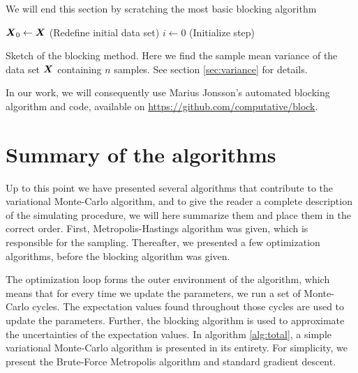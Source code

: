 We will end this section by scratching the most basic blocking algorithm

\IncMargin{1em}
\begin{algorithm}
	\SetAlgoLined
	\BlankLine
	$\boldsymbol{{X}}_0\leftarrow \boldsymbol{{X}}$ (Redefine initial data set)\;
	$i\leftarrow 0$ (Initialize step)\;
	\caption{Sketch of the blocking method. Here we find the sample mean variance of the data set $\boldsymbol{{X}}$ containing $n$ samples. See section \ref{sec:variance} for details.}
	\label{alg:blocking}
\end{algorithm}\DecMargin{1em}

In our work, we will consequently use Marius Jonsson's automated blocking algorithm and code, available on \url{https://github.com/computative/block}.

\section{Summary of the algorithms}
Up to this point we have presented several algorithms that contribute to the variational Monte-Carlo algorithm, and to give the reader a complete description of the simulating procedure, we will here summarize them and place them in the correct order. First, Metropolis-Hastings algorithm was given, which is responsible for the sampling. Thereafter, we presented a few optimization algorithms, before the blocking algorithm was given. 

The optimization loop forms the outer environment of the algorithm, which means that for every time we update the parameters, we run a set of Monte-Carlo cycles. The expectation values found throughout those cycles are used to update the parameters. Further, the blocking algorithm is used to approximate the uncertainties of the expectation values. In algorithm \ref{alg:total}, a simple variational Monte-Carlo algorithm is presented in its entirety. For simplicity, we present the Brute-Force Metropolis algorithm and standard gradient descent. 

